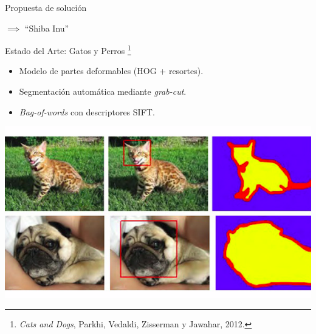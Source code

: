 \documentclass{beamer}
\begin{document}
\begin{frame}{Propuesta de solución}
\begin{itemize}
            \pause
            \begin{center}
                \pause
                $\implies$
                {``Shiba Inu''\ \ \ \ \ \ }
            \end{center}
    \end{itemize}
\end{frame}

\begin{frame}{Estado del Arte: Gatos y Perros \footnote{\emph{Cats and
    Dogs}, Parkhi, Vedaldi, Zisserman y Jawahar, 2012.}}
    \begin{itemize}
            \pause
        \item Modelo de partes deformables (HOG + resortes).
            \pause
        \item Segmentación automática mediante \emph{grab-cut}.
            \pause
        \item \emph{Bag-of-words} con descriptores SIFT. 
            \pause
    \end{itemize}
    \begin{center}
        \includegraphics[scale=0.3]{imagen/catsanddogs_annotation}
    \end{center}
\end{frame}
\end{document}

